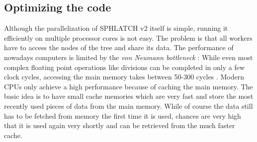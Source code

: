 \subsection{Optimizing the code}
Although the parallelization of SPHLATCH v2 itself is simple, running it efficiently on multiple processor cores is not easy. The problem is that all workers have to access the nodes of the tree and share its data. The performance of nowadays computers is limited by the \emph{von Neumann bottleneck} \citep{bryant2010computer}: While even most complex floating point operations like divisions can be completed in only a few clock cycles, accessing the main memory takes between 50-300 cycles \citep{2008WhitepaperFry}. Modern CPUs only achieve a high performance because of caching the main memory. The basic idea is to have small cache memories which are very fast and store the most recently used pieces of data from the main memory. While of course the data still has to be fetched from memory the first time it is used, chances are very high that it is used again very shortly and can be retrieved from the much faster cache. 

